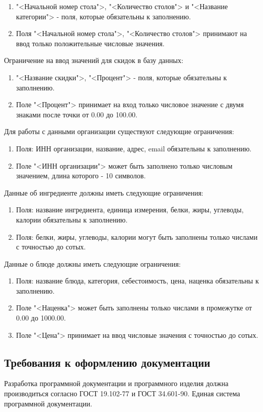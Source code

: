 \begin{enumerate}
	\item  "<Начальной номер стола">,  "<Количество столов"> и  "<Название категории"> - поля, которые обязательны к заполнению.
	\item Поля "<Начальной номер стола">,  "<Количество столов"> принимают на ввод только положительные числовые значения.
\end{enumerate}
Ограничение на ввод значений для скидок в базу данных:
\begin{enumerate}
	\item  "<Название скидки">,  "<Процент"> - поля, которые обязательны к заполнению.
	\item Поле "<Процент"> принимает на вход только числовое значение с двумя знаками после точки от 0.00 до 100.00.
\end{enumerate}
Для работы с данными организации существуют следующие ограничения:
\begin{enumerate}
	\item Поля: ИНН организации, название, адрес, email обязательны к заполнению.
	\item Поле "<ИНН организации"> может быть заполнено только числовым значением, длина которого - 10 символов.
\end{enumerate}
Данные об ингредиенте должны иметь следующие ограничения:
\begin{enumerate}
	\item Поля: название ингредиента, единица измерения, белки, жиры, углеводы, калории обязательны к заполнению.
	\item Поля: белки, жиры, углеводы, калории могут быть заполнены только числами с точностью до сотых.
\end{enumerate}
Данные о блюде должны иметь следующие ограничения:
\begin{enumerate}
	\item Поля: название блюда, категория, себестоимость, цена, наценка обязательны к заполнению.
	\item Поле "<Наценка"> может быть заполнены только числами в промежутке от 0.00 до 1000.00.
	\item Поле "<Цена"> принимает на ввод числовые значения с точностью до сотых.
\end{enumerate}
\subsection{Требования к оформлению документации}

Разработка программной документации и программного изделия должна производиться согласно ГОСТ 19.102-77 и ГОСТ 34.601-90. Единая система программной документации.
